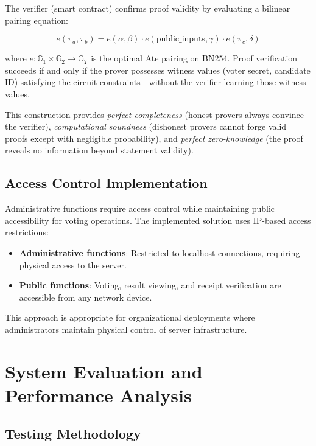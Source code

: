 \documentclass[conference]{IEEEtran}
\begin{document}
The verifier (smart contract) confirms proof validity by evaluating a bilinear pairing equation:

\begin{equation}
e(\pi_a, \pi_b) = e(\alpha, \beta) \cdot e(\text{public\_inputs}, \gamma) \cdot e(\pi_c, \delta)
\end{equation}

where $e: \mathbb{G}_1 \times \mathbb{G}_2 \rightarrow \mathbb{G}_T$ is the optimal Ate pairing on BN254. Proof verification succeeds if and only if the prover possesses witness values (voter secret, candidate ID) satisfying the circuit constraints---without the verifier learning those witness values.

This construction provides \textit{perfect completeness} (honest provers always convince the verifier), \textit{computational soundness} (dishonest provers cannot forge valid proofs except with negligible probability), and \textit{perfect zero-knowledge} (the proof reveals no information beyond statement validity).

\subsection{Access Control Implementation}

Administrative functions require access control while maintaining public accessibility for voting operations. The implemented solution uses IP-based access restrictions:
\begin{itemize}
    \item \textbf{Administrative functions}: Restricted to localhost connections, requiring physical access to the server.
    \item \textbf{Public functions}: Voting, result viewing, and receipt verification are accessible from any network device.
\end{itemize}

This approach is appropriate for organizational deployments where administrators maintain physical control of server infrastructure.

\section{System Evaluation and Performance Analysis}

\subsection{Testing Methodology}
\end{document}
